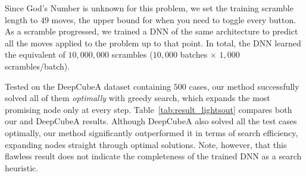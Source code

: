 \documentclass[nohyperref]{article}
\theoremstyle{plain}
\theoremstyle{definition}
\theoremstyle{remark}
\begin{document}
Since God's Number is unknown for this problem, we set the training scramble length to $49$ moves, the upper bound for when you need to toggle every button.
As a scramble progressed, we trained a DNN of the same architecture to predict all the moves applied to the problem up to that point.
In total, the DNN learned the equivalent of $10,000,000$ scrambles ($10,000$ batches $\times$ $1,000$ scrambles/batch).

Tested on the DeepCubeA dataset containing $500$ cases, our method successfully solved all of them \textit{optimally} with greedy search, which expands the most promising node only at every step.
Table~\ref{tab:result_lightsout} compares both our and DeepCubeA results.
Although DeepCubeA also solved all the test cases optimally, our method significantly outperformed it in terms of search efficiency, expanding nodes straight through optimal solutions.
Note, however, that this flawless result does not indicate the completeness of the trained DNN as a search heuristic.



%  

\end{document}
